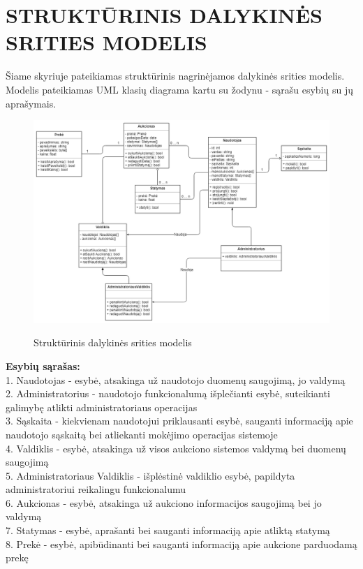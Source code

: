 \documentclass{VUMIFPSkursinis}
\begin{document}
	\section{STRUKTŪRINIS DALYKINĖS SRITIES MODELIS}
	Šiame skyriuje pateikiamas struktūrinis nagrinėjamos dalykinės srities modelis. Modelis pateikiamas UML klasių diagrama kartu su žodynu - sąrašu esybių su jų aprašymais.
	\begin{figure}[H]
		\centering
		\includegraphics[width=\linewidth]{img/umlClassDiagram.png}
		\label{fig:usecase}
		\caption{Struktūrinis dalykinės srities modelis}
	\end{figure}
	\noindent
	\textbf{Esybių sąrašas:} \\
	1. Naudotojas - esybė, atsakinga už naudotojo duomenų saugojimą, jo valdymą\\
	2. Administratorius - naudotojo funkcionalumą išplečianti esybė, suteikianti galimybę atlikti administratoriaus operacijas\\
	3. Sąskaita - kiekvienam naudotojui priklausanti esybė, sauganti informaciją apie naudotojo sąskaitą bei atliekanti mokėjimo operacijas sistemoje\\
	4. Valdiklis - esybė, atsakinga už visos aukciono sistemos valdymą bei duomenų saugojimą\\
	5. Administratoriaus Valdiklis - išplėstinė valdiklio esybė, papildyta administratoriui reikalingu funkcionalumu\\
	6. Aukcionas - esybė, atsakinga už aukciono informacijos saugojimą bei jo valdymą\\
	7. Statymas - esybė, aprašanti bei sauganti informaciją apie atliktą statymą\\
	8. Prekė - esybė, apibūdinanti bei sauganti informaciją apie aukcione parduodamą prekę\\
	
\end{document}
